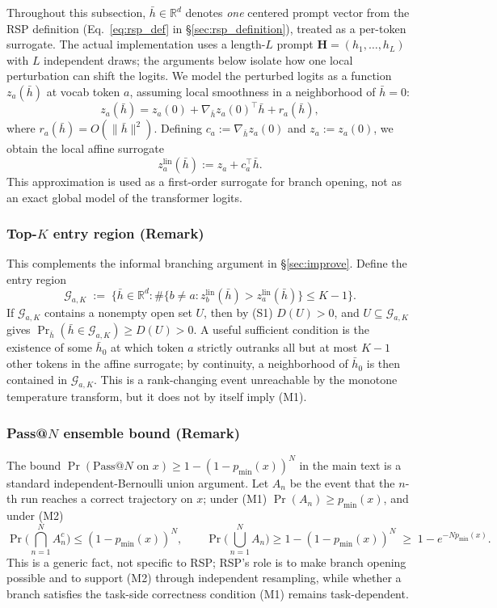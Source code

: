 Throughout this subsection, $\bar h\in\mathbb{R}^d$ denotes \emph{one} centered prompt vector from the RSP definition (Eq.~\eqref{eq:rsp_def} in §\ref{sec:rsp_definition}), treated as a per-token surrogate. The actual implementation uses a length-$L$ prompt $\mathbf{H}=(h_1,\dots,h_L)$ with $L$ independent draws; the arguments below isolate how one local perturbation can shift the logits. We model the perturbed logits as a function $z_a(\bar{h})$ at vocab token $a$, assuming local smoothness in a neighborhood of $\bar{h}=0$:
\[
z_a(\bar{h}) = z_a(0) + \nabla_{\bar h} z_a(0)^\top \bar{h} + r_a(\bar{h}),
\]
where $r_a(\bar{h}) = O(\|\bar{h}\|^2)$. Defining $c_a := \nabla_{\bar h} z_a(0)$ and $z_a := z_a(0)$, we obtain the local affine surrogate
\[
z_a^{\mathrm{lin}}(\bar{h}) := z_a + c_a^\top \bar{h}.
\]
This approximation is used as a first-order surrogate for branch opening, not as an exact global model of the transformer logits.

\subsubsection{Top-$K$ entry region (Remark)}\label{app:topk_entry}

This complements the informal branching argument in \S\ref{sec:improve}. Define the entry region
\[
\mathcal{G}_{a,K}
\;:=\;
\bigl\{\bar h \in \mathbb{R}^d : \#\{b\neq a : z_b^{\mathrm{lin}}(\bar h) > z_a^{\mathrm{lin}}(\bar h)\} \le K-1\bigr\}.
\]
If $\mathcal{G}_{a,K}$ contains a nonempty open set $U$, then by (S1) $D(U)>0$, and $U\subseteq\mathcal{G}_{a,K}$ gives $\Pr_{\bar h}(\bar h\in\mathcal{G}_{a,K})\ge D(U)>0$. A useful sufficient condition is the existence of some $\bar h_0$ at which token $a$ strictly outranks all but at most $K-1$ other tokens in the affine surrogate; by continuity, a neighborhood of $\bar h_0$ is then contained in $\mathcal{G}_{a,K}$. This is a rank-changing event unreachable by the monotone temperature transform, but it does not by itself imply (M1).

\subsubsection{Pass@$N$ ensemble bound (Remark)}\label{app:passN_ensemble}

The bound $\Pr(\mathrm{Pass@}N \text{ on } x) \ge 1-(1-p_{\min}(x))^N$ in the main text is a standard independent-Bernoulli union argument. Let $A_n$ be the event that the $n$-th run reaches a correct trajectory on $x$; under (M1) $\Pr(A_n)\ge p_{\min}(x)$, and under (M2)
\[
\Pr\!\Big(\bigcap_{n=1}^N A_n^c\Big)
\le (1-p_{\min}(x))^N,
\qquad
\Pr\!\Big(\bigcup_{n=1}^N A_n\Big)
\ge 1-(1-p_{\min}(x))^N
\;\ge\; 1-e^{-N p_{\min}(x)}.
\]
This is a generic fact, not specific to RSP; RSP's role is to make branch opening possible and to support (M2) through independent resampling, while whether a branch satisfies the task-side correctness condition (M1) remains task-dependent.

